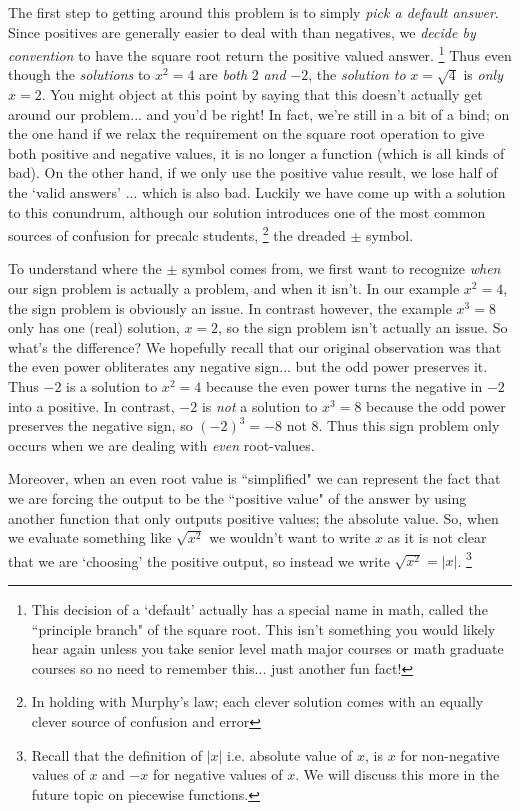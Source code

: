 \documentclass{ximeraXloud}
\begin{document}
The first step to getting around this problem is to simply \textit{pick a default answer}. Since positives are generally easier to deal with than negatives, we \textit{decide by convention} to have the square root return the positive valued answer.%
\footnote{%
    This decision of a `default' actually has a special name in math, called the ``principle branch" of the square root. This isn't something you would likely hear again unless you take senior level math major courses or math graduate courses so no need to remember this... just another fun fact!%
    }
Thus even though the \textit{solutions} to $x^2 = 4$ are \textit{both} $2$ \textit{and} $-2$, the \textit{solution to} $x = \sqrt{4}$ is \textit{only} $x = 2$. You might object at this point by saying that this doesn't actually get around our problem... and you'd be right! In fact, we're still in a bit of a bind; on the one hand if we relax the requirement on the square root operation to give both positive and negative values, it is no longer a function (which is all kinds of bad). On the other hand, if we only use the positive value result, we lose half of the `valid answers' ... which is also bad. Luckily we have come up with a solution to this conundrum, although our solution introduces one of the most common sources of confusion for precalc students,%
\footnote{%
    In holding with Murphy's law; each clever solution comes with an equally clever source of confusion and error%
    }%
the dreaded $\pm$ symbol.

To understand where the $\pm$ symbol comes from, we first want to recognize \textit{when} our sign problem is actually a problem, and when it isn't. In our example $x^2 = 4$, the sign problem is obviously an issue. In contrast however, the example $x^3 = 8$ only has one (real) solution, $x = 2$, so the sign problem isn't actually an issue. So what's the difference? We hopefully recall that our original observation was that the even power obliterates any negative sign... but the odd power preserves it. Thus $-2$ is a solution to $x^2 = 4$ because the even power turns the negative in $-2$ into a positive. In contrast, $-2$ is \textit{not} a solution to $x^3 = 8$ because the odd power preserves the negative sign, so $(-2)^3 = -8$ not $8$. Thus this sign problem only occurs when we are dealing with \textit{even} root-values.

Moreover, when an even root value is ``simplified" we can represent the fact that we are forcing the output to be the ``positive value" of the answer by using another function that only outputs positive values; the absolute value. So, when we evaluate something like $\sqrt{x^2}$ we wouldn't want to write $x$ as it is not clear that we are `choosing' the positive output, so instead we write $\sqrt{x^2} = |x|$.%
\footnote{Recall that the definition of $|x|$ i.e. absolute value of $x$, is $x$ for non-negative values of $x$ and $-x$ for negative values of $x$. We will discuss this more in the future topic on piecewise functions.}
\end{document}
